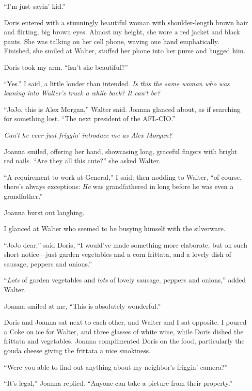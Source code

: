 ``I'm just sayin' kid.''

Doris entered with a stunningly beautiful woman with shoulder-length
brown hair and flirting, big brown eyes. Almost my height, she wore a
red jacket and black pants. She was talking on her cell phone, waving
one hand emphatically. Finished, she smiled at Walter, stuffed her phone
into her purse and hugged him.

Doris took my arm. ``Isn't she beautiful?''

``Yes.'' I said, a little louder than intended. \emph{Is this the same
woman who was leaning into Walter's truck a while back? It can't be?}

``JoJo, this is Alex Morgan,'' Walter said. Joanna glanced about, as if
searching for something lost. ``The next president of the AFL-CIO.''

\emph{Can't he ever just friggin' introduce me as Alex Morgan?}

Joanna smiled, offering her hand, showcasing long, graceful fingers with
bright red nails. ``Are they all this cute?'' she asked Walter.

``A requirement to work at General,'' I said; then nodding to Walter,
``of course, there's always exceptions: \emph{He} was grandfathered in
long before he was even a grandfather.''

Joanna burst out laughing.

I glanced at Walter who seemed to be busying himself with the
silverware.

``JoJo dear,'' said Doris, ``I would've made something more elaborate,
but on such short notice---just garden vegetables and a corn frittata,
and a lovely dish of sausage, peppers and onions.''

``\emph{Lots} of garden vegetables and \emph{lots} of lovely sausage,
peppers and onions,'' added Walter.

Joanna smiled at me, ``This is absolutely wonderful.''

Doris and Joanna sat next to each other, and Walter and I sat opposite.
I poured a Coke on ice for Walter, and three glasses of white wine,
while Doris dished the frittata and vegetables. Joanna complimented
Doris on the food, particularly the gouda cheese giving the frittata a
nice smokiness.

``Were you able to find out anything about my neighbor's friggin'
camera?''

``It's legal,'' Joanna replied. ``Anyone can take a picture from their
property.''

